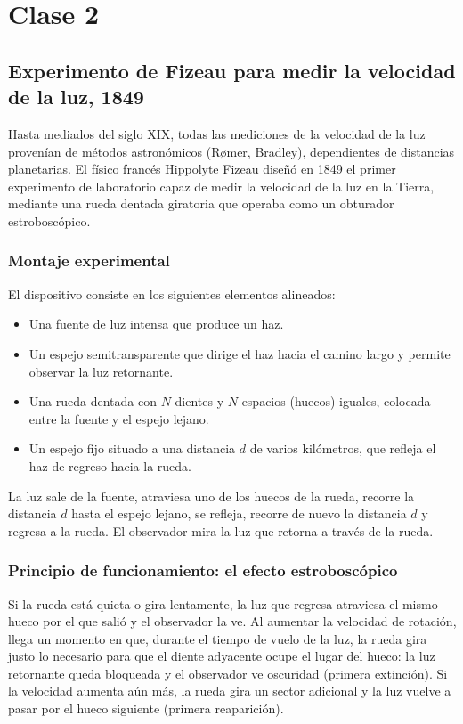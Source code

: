 \chapter{Clase 2}
\section{Experimento de Fizeau para medir la velocidad de la luz, 1849}

Hasta mediados del siglo XIX, todas las mediciones de la velocidad de la luz provenían de métodos astronómicos (Rømer, Bradley), dependientes de distancias planetarias. El físico francés Hippolyte Fizeau diseñó en 1849 el primer experimento de laboratorio capaz de medir la velocidad de la luz en la Tierra, mediante una rueda dentada giratoria que operaba como un obturador estroboscópico.

\subsection{Montaje experimental}

El dispositivo consiste en los siguientes elementos alineados:
\begin{itemize}
    \item Una fuente de luz intensa que produce un haz.
    \item Un espejo semitransparente que dirige el haz hacia el camino largo y permite observar la luz retornante.
    \item Una rueda dentada con $N$ dientes y $N$ espacios (huecos) iguales, colocada entre la fuente y el espejo lejano.
    \item Un espejo fijo situado a una distancia $d$ de varios kilómetros, que refleja el haz de regreso hacia la rueda.
\end{itemize}

La luz sale de la fuente, atraviesa uno de los huecos de la rueda, recorre la distancia $d$ hasta el espejo lejano, se refleja, recorre de nuevo la distancia $d$ y regresa a la rueda. El observador mira la luz que retorna a través de la rueda.

\subsection{Principio de funcionamiento: el efecto estroboscópico}

Si la rueda está quieta o gira lentamente, la luz que regresa atraviesa el mismo hueco por el que salió y el observador la ve. Al aumentar la velocidad de rotación, llega un momento en que, durante el tiempo de vuelo de la luz, la rueda gira justo lo necesario para que el diente adyacente ocupe el lugar del hueco: la luz retornante queda bloqueada y el observador ve oscuridad (primera extinción). Si la velocidad aumenta aún más, la rueda gira un sector adicional y la luz vuelve a pasar por el hueco siguiente (primera reaparición).

